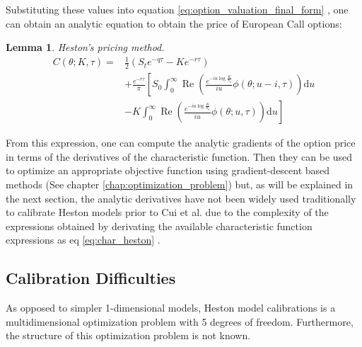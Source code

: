 \documentclass[12,twoside]{mammeTFM}
\newtheorem{lem}[thm]{Lemma}
\theoremstyle{definition}
\theoremstyle{remark}
\begin{document}
Substituting these values into equation \ref{eq:option_valuation_final_form} , one can obtain an analytic equation to obtain the price of European Call options:


\begin{lem} Heston's pricing method.
\begin{equation} \label{eq:heston_analytic}
\begin{aligned}
C(\theta ; K, \tau)=& \frac{1}{2}\left(S_{t} e^{-q \tau}-K e^{-r \tau}\right) \\
&+\frac{e^{-r \tau}}{\pi}\left[S_{0} \int_{0}^{\infty} \operatorname{Re}\left(\frac{e^{-i u \log \frac{K}{S_0}}}{i u} \phi(\theta ; u-i, \tau)\right) \mathrm{d} u\right. \\
&\left.-K \int_{0}^{\infty} \operatorname{Re}\left(\frac{e^{-i u \log \frac{K}{S_0}}}{i u} \phi(\theta ; u, \tau)\right) \mathrm{d} u\right]
\end{aligned}
\end{equation}

\end{lem}

From this expression, one can compute the analytic gradients of the option price in terms of the derivatives of the characteristic function. Then they can be used to optimize an appropriate objective function using gradient-descent based methods (See chapter \ref{chap:optimization_problem}) but, as will be explained in the next section, the analytic derivatives have not been widely used traditionally to calibrate Heston models prior to Cui et al. due to the complexity of the expressions obtained by derivating the available characteristic function expressions as eq \ref{eq:char_heston}  \cite{cui17}.

\subsection{Calibration Difficulties}
As opposed to simpler 1-dimensional models, Heston model calibrations is a multidimensional optimization problem with 5 degrees of freedom. Furthermore, the structure of this optimization problem is not known.
\end{document}
